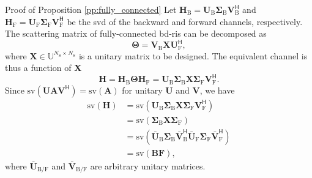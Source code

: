 \documentclass[journal]{IEEEtran}
\begin{document}
\begin{appendix}
	\begin{subsection}{Proof of Proposition \ref{pp:fully_connected}}\label{ap:fully_connected}
		Let $\mathbf{H}_\mathrm{B} = \mathbf{U}_\mathrm{B} \mathbf{\Sigma}_\mathrm{B} \mathbf{V}_\mathrm{B}^\mathsf{H}$ and $\mathbf{H}_\mathrm{F} = \mathbf{U}_\mathrm{F} \mathbf{\Sigma}_\mathrm{F} \mathbf{V}_\mathrm{F}^\mathsf{H}$ be the \gls{svd} of the backward and forward channels, respectively.
		The scattering matrix of fully-connected \gls{bd}-\gls{ris} can be decomposed as
		\begin{equation}
			\mathbf{\Theta} = \mathbf{V}_\mathrm{B} \mathbf{X} \mathbf{U}_\mathrm{F}^\mathsf{H},
			\label{eq:scattering_fc}
		\end{equation}
		where $\mathbf{X} \in \mathbb{U}^{N_\mathrm{S} \times N_\mathrm{S}}$ is a unitary matrix to be designed.
		The equivalent channel is thus a function of $\mathbf{X}$
		\begin{equation}
			\mathbf{H} = \mathbf{H}_\mathrm{B} \mathbf{\Theta} \mathbf{H}_\mathrm{F} = \mathbf{U}_\mathrm{B} \mathbf{\Sigma}_\mathrm{B} \mathbf{X} \mathbf{\Sigma}_\mathrm{F} \mathbf{V}_\mathrm{F}^\mathsf{H}.
			\label{eq:channel_equivalent_fc}
		\end{equation}
		Since $\mathrm{sv}(\mathbf{U} \mathbf{A} \mathbf{V}^\mathsf{H}) = \mathrm{sv}(\mathbf{A})$ for unitary $\mathbf{U}$ and $\mathbf{V}$, we have
		\begin{align*}
			\mathrm{sv}(\mathbf{H}) & = \mathrm{sv}(\mathbf{U}_\mathrm{B} \mathbf{\Sigma}_\mathrm{B} \mathbf{X} \mathbf{\Sigma}_\mathrm{F} \mathbf{V}_\mathrm{F}^\mathsf{H})                                                                     \\
			                        & = \mathrm{sv}(\mathbf{\Sigma}_\mathrm{B} \mathbf{X} \mathbf{\Sigma}_\mathrm{F})                                                                                                                            \\
			                        & = \mathrm{sv}(\bar{\mathbf{U}}_\mathrm{B} \mathbf{\Sigma}_\mathrm{B} \mathbf{\bar{V}}_\mathrm{B}^\mathsf{H} \bar{\mathbf{U}}_\mathrm{F} \mathbf{\Sigma}_\mathrm{F} \mathbf{\bar{V}}_\mathrm{F}^\mathsf{H}) \\
			                        & = \mathrm{sv}(\mathbf{BF}),
		\end{align*}
		where $\bar{\mathbf{U}}_{\mathrm{B}/\mathrm{F}}$ and $\bar{\mathbf{V}}_{\mathrm{B}/\mathrm{F}}$ are arbitrary unitary matrices.
	\end{subsection}


\end{appendix}
\end{document}
